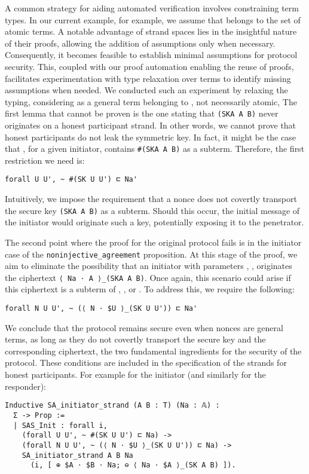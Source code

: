 A common strategy for aiding automated verification involves constraining term types. In our current example, for example, we assume that \Na belongs to the set \T of atomic terms. A notable advantage of strand spaces lies in the insightful nature of their proofs, allowing the addition of assumptions only when necessary. Consequently, it becomes feasible to establish minimal assumptions for protocol security. This, coupled with our proof automation enabling the reuse of proofs, facilitates experimentation with type relaxation over terms to identify missing assumptions when needed. We conducted such an experiment by relaxing the typing, considering \Na as a general term belonging to \terms, not necessarily atomic,
The first lemma that cannot be proven is the one stating that \lstinline{(SKA A B)} never originates on a honest participant strand. In other words, we cannot prove that honest participants do not leak the symmetric key.
In fact, it might be the case that \Nap, for a given initiator, contains \lstinline{#(SKA A B)} as a subterm.
Therefore, the first restriction we need is:
\begin{lstlisting}
forall U U', ~ #(SK U U') ⊏ Na'
\end{lstlisting}
Intuitively, we impose the requirement that a nonce does not covertly transport the secure key  \lstinline{(SKA A B)} as a subterm. Should this occur, the initial message of the initiator would originate such a key, potentially exposing it to the penetrator.

The second point where the proof for the original protocol fails is in the initiator case of the \lstinline{noninjective_agreement} proposition. At this stage of the proof, we aim to eliminate the possibility that an initiator with parameters \Ap, \Bp, \Nap originates the ciphertext \lstinline{⟨ Na ⋅ A ⟩_(SKA A B)}. Once again, this scenario could arise if this ciphertext is a subterm of \Ap, \Bp, or \Nap.
To address this, we require the following:
\begin{lstlisting}
forall N U U', ~ (⟨ N ⋅ $U ⟩_(SK U U')) ⊏ Na'
\end{lstlisting}
We conclude that the protocol remains secure even when nonces are general terms, as long as they do not covertly transport the secure key and the corresponding ciphertext, the two fundamental ingredients for the security of the protocol.
These conditions are included in the specification of the strands for honest participants.
For example for the initiator (and similarly for the responder):
\begin{lstlisting}
Inductive SA_initiator_strand (A B : T) (Na : 𝔸) :
  Σ -> Prop :=
  | SAS_Init : forall i,
    (forall U U', ~ #(SK U U') ⊏ Na) ->
    (forall N U U', ~ (⟨ N ⋅ $U ⟩_(SK U U')) ⊏ Na) ->
    SA_initiator_strand A B Na
      (i, [ ⊕ $A ⋅ $B ⋅ Na; ⊖ ⟨ Na ⋅ $A ⟩_(SK A B) ]).
\end{lstlisting}

